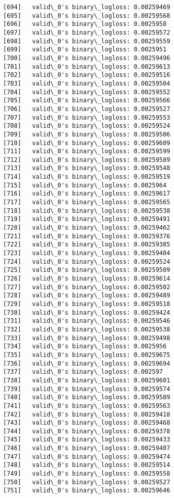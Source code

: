 \documentclass[11pt]{article}
\begin{document}
\begin{Verbatim}[commandchars=\\\{\}]
[694]	valid\_0's binary\_logloss: 0.00259469
[695]	valid\_0's binary\_logloss: 0.00259568
[696]	valid\_0's binary\_logloss: 0.0025958
[697]	valid\_0's binary\_logloss: 0.00259572
[698]	valid\_0's binary\_logloss: 0.00259559
[699]	valid\_0's binary\_logloss: 0.0025951
[700]	valid\_0's binary\_logloss: 0.00259496
[701]	valid\_0's binary\_logloss: 0.00259613
[702]	valid\_0's binary\_logloss: 0.00259516
[703]	valid\_0's binary\_logloss: 0.00259504
[704]	valid\_0's binary\_logloss: 0.00259552
[705]	valid\_0's binary\_logloss: 0.00259566
[706]	valid\_0's binary\_logloss: 0.00259527
[707]	valid\_0's binary\_logloss: 0.00259553
[708]	valid\_0's binary\_logloss: 0.00259524
[709]	valid\_0's binary\_logloss: 0.00259506
[710]	valid\_0's binary\_logloss: 0.00259609
[711]	valid\_0's binary\_logloss: 0.00259599
[712]	valid\_0's binary\_logloss: 0.00259589
[713]	valid\_0's binary\_logloss: 0.00259548
[714]	valid\_0's binary\_logloss: 0.00259519
[715]	valid\_0's binary\_logloss: 0.0025964
[716]	valid\_0's binary\_logloss: 0.00259617
[717]	valid\_0's binary\_logloss: 0.00259565
[718]	valid\_0's binary\_logloss: 0.00259538
[719]	valid\_0's binary\_logloss: 0.00259491
[720]	valid\_0's binary\_logloss: 0.00259462
[721]	valid\_0's binary\_logloss: 0.00259376
[722]	valid\_0's binary\_logloss: 0.00259385
[723]	valid\_0's binary\_logloss: 0.00259404
[724]	valid\_0's binary\_logloss: 0.00259524
[725]	valid\_0's binary\_logloss: 0.00259509
[726]	valid\_0's binary\_logloss: 0.00259614
[727]	valid\_0's binary\_logloss: 0.00259502
[728]	valid\_0's binary\_logloss: 0.00259489
[729]	valid\_0's binary\_logloss: 0.00259518
[730]	valid\_0's binary\_logloss: 0.00259424
[731]	valid\_0's binary\_logloss: 0.00259546
[732]	valid\_0's binary\_logloss: 0.00259538
[733]	valid\_0's binary\_logloss: 0.00259498
[734]	valid\_0's binary\_logloss: 0.0025956
[735]	valid\_0's binary\_logloss: 0.00259675
[736]	valid\_0's binary\_logloss: 0.00259694
[737]	valid\_0's binary\_logloss: 0.002597
[738]	valid\_0's binary\_logloss: 0.00259601
[739]	valid\_0's binary\_logloss: 0.00259574
[740]	valid\_0's binary\_logloss: 0.00259589
[741]	valid\_0's binary\_logloss: 0.00259563
[742]	valid\_0's binary\_logloss: 0.00259418
[743]	valid\_0's binary\_logloss: 0.00259468
[744]	valid\_0's binary\_logloss: 0.00259378
[745]	valid\_0's binary\_logloss: 0.00259433
[746]	valid\_0's binary\_logloss: 0.00259407
[747]	valid\_0's binary\_logloss: 0.00259474
[748]	valid\_0's binary\_logloss: 0.00259514
[749]	valid\_0's binary\_logloss: 0.00259558
[750]	valid\_0's binary\_logloss: 0.00259527
[751]	valid\_0's binary\_logloss: 0.00259646

\end{Verbatim}
\end{document}
